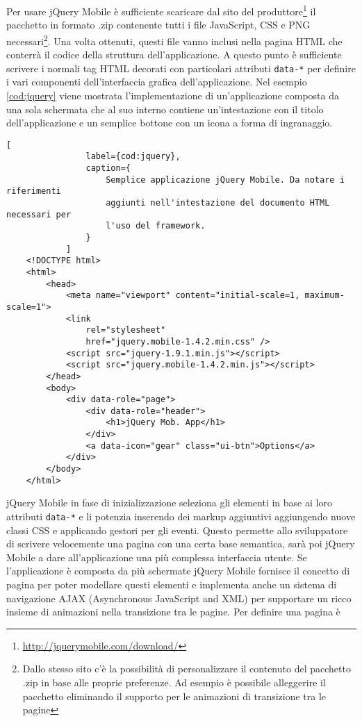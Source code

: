 			Per usare jQuery Mobile è sufficiente scaricare dal sito del
			produttore\footnote{\url{http://jquerymobile.com/download/}} il
			pacchetto in formato .zip contenente tutti i file JavaScript, CSS e
			PNG necessari\footnote{Dallo stesso sito c'è la possibilità di
			personalizzare il contenuto del pacchetto .zip in base alle proprie
			preferenze. Ad esempio è possibile alleggerire il pacchetto
			eliminando il supporto per le animazioni di transizione tra le
			pagine}. Una volta ottenuti, questi file vanno inclusi nella pagina
			HTML che conterrà il codice della struttura dell'applicazione. A
			questo punto è sufficiente scrivere i normali tag HTML decorati con
			particolari attributi \verb|data-*| per definire i vari componenti
			dell'interfaccia grafica dell'applicazione. Nel esempio \ref{cod:jquery}
			viene mostrata l'implementazione di un'applicazione composta da
			una sola schermata che al suo interno contiene un'intestazione con
			il titolo dell'applicazione e un semplice bottone con un icona a
			forma di ingranaggio.\clearpage
			\begin{lstlisting}[
				label={cod:jquery},
				caption={
					Semplice applicazione jQuery Mobile. Da notare i riferimenti
					aggiunti nell'intestazione del documento HTML necessari per
					l'uso del framework.
				}
			]
	<!DOCTYPE html>
	<html>
		<head>
			<meta name="viewport" content="initial-scale=1, maximum-scale=1">
			<link
				rel="stylesheet"
				href="jquery.mobile-1.4.2.min.css" />
			<script src="jquery-1.9.1.min.js"></script>
			<script src="jquery.mobile-1.4.2.min.js"></script>
		</head>
		<body>
			<div data-role="page">
				<div data-role="header">
					<h1>jQuery Mob. App</h1>
				</div>
				<a data-icon="gear" class="ui-btn">Options</a>
			</div>
		</body>
	</html>
			\end{lstlisting}
			jQuery Mobile in fase di inizializzazione seleziona gli elementi in
			base ai loro attributi \verb|data-*| e li potenzia inserendo dei markup
			aggiuntivi aggiungendo nuove classi CSS e applicando gestori per gli
			eventi.	Questo permette allo sviluppatore di scrivere velocemente
			una pagina con una certa base semantica, sarà poi jQuery Mobile a
			dare all'applicazione una più complessa interfaccia utente.	Se
			l'applicazione è composta da più schermate jQuery Mobile fornisce 
			il concetto di pagina per poter modellare questi elementi e
			implementa anche un sistema di navigazione AJAX (Asynchronous
			JavaScript and XML) per supportare un ricco insieme di animazioni
			nella transizione tra le pagine. Per definire una pagina è
